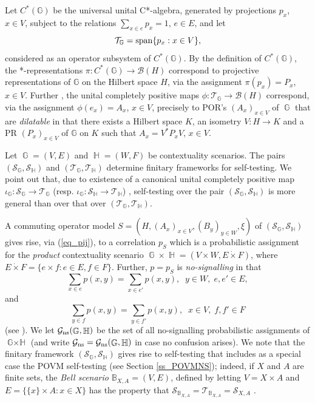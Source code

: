 \documentclass[11pt]{amsart}
\theoremstyle{definition}
\DeclareMathOperator{\Gg}{\mathcal{G}}
\DeclareMathOperator{\G}{\mathbb{G}}
\DeclareMathOperator{\Hbb}{\mathbb{H}}
\DeclareMathOperator{\GH}{\mathbb{G}\times \mathbb{H}}
\newcommand{\cl}[1]{\mathcal{#1}}
\newcommand{\bb}[1]{\mathbb{#1}}
\begin{document}
Let $C^*(\bb{G})$ be the universal unital C*-algebra, generated by 
projections $p_x$, $x\in V$, subject to the relations 
$\sum_{x\in e} p_x = 1$, $e\in E$, and let 
$$\cl T_{\bb{G}} = {\rm span}\{p_x : x\in V\},$$
considered as an operator subsystem of $C^*(\bb{G})$. 
By the definition of $C^*(\bb{G})$, 
the *-representations $\pi : C^*(\bb{G})\to \cl B(H)$ correspond to 
projective representations of $\bb{G}$ on the Hilbert space $H$, 
via the assignment $\pi(p_x) = P_x$, $x\in V$. 
Further \cite{act}, the unital completely positive maps 
$\phi : \cl T_{\bb{G}}\to \cl B(H)$ correspond, via the assignment $\phi(e_x) = A_x$, $x\in V$, precisely to POR's $(A_x)_{x\in V}$ of $\G$ that are 
\emph{dilatable} in that there exists a Hilbert space $K$, an isometry 
$V : H\to K$ and a PR $(P_x)_{x\in V}$ of $\bb{G}$ on $K$ such that 
$A_x = V^*P_x V$, $x\in V$.





Let $\G=(V,E)$ and $ \Hbb =(W,F)$ be contextuality scenarios.  
The pairs $(\cl S_{\bb{G}},\cl S_{\bb{H}})$ and 
$(\cl T_{\bb{G}},\cl T_{\bb{H}})$ 
determine finitary frameworks for self-testing. 
We point out that, due to existence of a canonical 
unital completely positive map 
$\iota_{\bb{G}} : \cl S_{\bb{G}} \to \cl T_{\bb{G}}$
(resp. $\iota_{\bb{G}} : \cl S_{\bb{H}} \to \cl T_{\bb{H}}$) \cite{act}, 
self-testing over the pair $(\cl S_{\bb{G}},\cl S_{\bb{H}})$ is more 
general than over that over $(\cl T_{\bb{G}},\cl T_{\bb{H}})$. 

A commuting operator model 
$S = (H,(A_x)_{x\in V},(B_y)_{y\in W}, \xi)$ of $(\cl S_{\bb{G}},\cl S_{\bb{H}})$
gives rise, via (\ref{eq_pij}), to a correlation $p_S$  which
is a probabilistic assignment 
for the \emph{product} contextuality scenario
$ \G \times \Hbb = (V\times W,E \dot{\times} F)$, 
where $E \dot{\times} F = \{e\times f : e\in E, f\in F\}$.
Further, $p = p_S$ is \emph{no-signalling} in that 
$$    \sum_{x\in e}p(x,y) = \sum_{x\in e'}p(x,y), \; \;  y \in W, \;  e,e' \in E,$$
and
$$    \sum_{y\in f}p(x,y) = \sum_{y\in f'}p(x,y), \; \;  x \in V, \;  f,f' \in F$$
(see \cite{acin-etal}). 
We let $\Gg_{\rm ns}(\G,\Hbb)$ be 
the set of all no-signalling probabilistic assignments of $\GH$
(and write $\Gg_{\rm ns} = \Gg_{\rm ns}(\G,\Hbb)$ in case 
no confusion arises).
We note that the finitary framework $(\cl S_{\bb{G}},\cl S_{\bb{H}})$
gives rise to self-testing that includes as a special case the 
POVM self-testing (see Section \ref{ss_POVMNS}); indeed, 
if $X$ and $A$ are finite sets, 
the \emph{Bell scenario} $\bb{B}_{X,A} = (V,E)$, defined by letting
$V = X\times A$ and 
$E = \{\{x\}\times A : x\in X\}$ has the property that 
$\cl S_{\bb{B}_{X,A}} = \cl T_{\bb{B}_{X,A}} = \cl S_{X,A}$ \cite{act}. 
\end{document}
